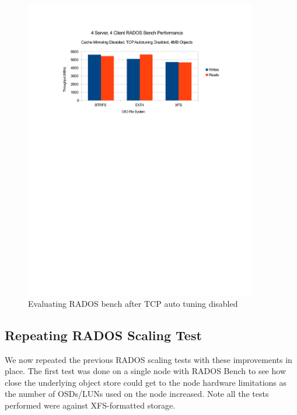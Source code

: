 \documentclass{article}
\begin{document}
\begin{figure}[htb]
\centering
\includegraphics[width=4.0in]{rados-after-ddn-tcptune}
\caption{Evaluating RADOS bench after TCP auto tuning disabled}
\label{fig:rados-tcp-auto-disabled}
\end{figure}




\subsection{Repeating RADOS Scaling Test}

We now repeated the previous RADOS scaling tests with these improvements in place.
The first test was done on a single node with RADOS Bench to see how close the
underlying object store could get to the node hardware limitations as the number
of OSDs/LUNs used on the node increased. Note all the tests performed were against
XFS-formatted storage.


\end{document}
